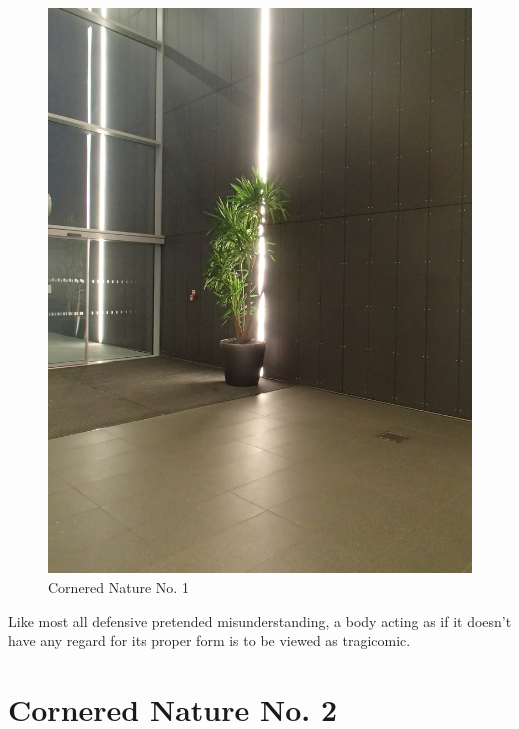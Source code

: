 \documentclass{book}
\begin{document}
\begin{figure}
\centering
\includegraphics[width=\textwidth,angle=-90]{figures/P1050156.JPG}
\caption{Cornered Nature No. 1}
\end{figure}

Like most all defensive pretended misunderstanding, a body acting as if it
doesn't have any regard for its proper form is to be viewed as tragicomic.

\chapter{Cornered Nature No. 2}
\end{document}
